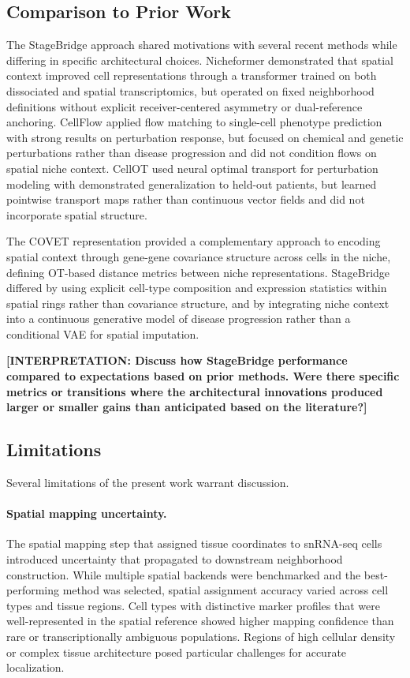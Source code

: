 \subsection{Comparison to Prior Work}

The StageBridge approach shared motivations with several recent methods while differing in specific architectural choices. Nicheformer \cite{Tejada-Lapuerta2025-wz} demonstrated that spatial context improved cell representations through a transformer trained on both dissociated and spatial transcriptomics, but operated on fixed neighborhood definitions without explicit receiver-centered asymmetry or dual-reference anchoring. CellFlow \cite{Klein2025-sr} applied flow matching to single-cell phenotype prediction with strong results on perturbation response, but focused on chemical and genetic perturbations rather than disease progression and did not condition flows on spatial niche context. CellOT \cite{Bunne2023-bm} used neural optimal transport for perturbation modeling with demonstrated generalization to held-out patients, but learned pointwise transport maps rather than continuous vector fields and did not incorporate spatial structure.

The COVET representation \cite{Haviv2025-kd} provided a complementary approach to encoding spatial context through gene-gene covariance structure across cells in the niche, defining OT-based distance metrics between niche representations. StageBridge differed by using explicit cell-type composition and expression statistics within spatial rings rather than covariance structure, and by integrating niche context into a continuous generative model of disease progression rather than a conditional VAE for spatial imputation.

\textbf{[INTERPRETATION: Discuss how StageBridge performance compared to expectations based on prior methods. Were there specific metrics or transitions where the architectural innovations produced larger or smaller gains than anticipated based on the literature?]}


\subsection{Limitations}

Several limitations of the present work warrant discussion.

\paragraph{Spatial mapping uncertainty.} The spatial mapping step that assigned tissue coordinates to snRNA-seq cells introduced uncertainty that propagated to downstream neighborhood construction. While multiple spatial backends were benchmarked and the best-performing method was selected, spatial assignment accuracy varied across cell types and tissue regions. Cell types with distinctive marker profiles that were well-represented in the spatial reference showed higher mapping confidence than rare or transcriptionally ambiguous populations. Regions of high cellular density or complex tissue architecture posed particular challenges for accurate localization.

